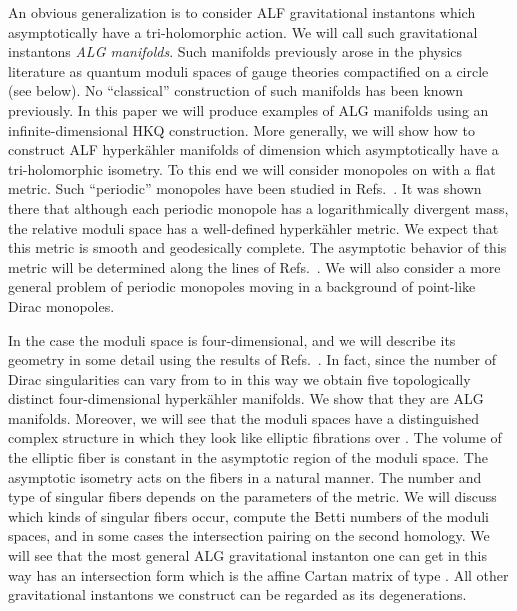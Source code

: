 \documentclass[a4paper,12pt, amsfonts, amssymb]{article}
\providecommand{\CC}{{\mathbb C}}
\providecommand{\RR}{{\mathbb R}}
\renewcommand{\SS}{{\mathbb S}}
\begin{document}
An obvious generalization is to consider ALF gravitational instantons
which asymptotically have a tri-holomorphic \coordHE{} action. We will call such
gravitational instantons {\it ALG manifolds}. Such manifolds previously
arose in the physics literature as quantum moduli spaces of \coordHE{}  \coordHE{} gauge
theories compactified on a circle (see below). No ``classical''
construction of such manifolds has been known previously. In this paper we
will produce examples of ALG manifolds using an infinite-dimensional HKQ
construction. More generally, we will show
how to construct ALF hyperk\"ahler manifolds of dimension \coordHE{} which
asymptotically have a tri-holomorphic \coordHE{} isometry.
To this end we will consider \coordHE{}  \coordHE{} monopoles on
\myHighlight{$\RR^2\times\SS^1$}\coordHE{} with a flat metric. Such ``periodic'' monopoles have
been studied in Refs.~\cite{usone, ustwo}.
It was shown there that although each
periodic monopole has a logarithmically divergent mass, the relative
moduli space has a well-defined hyperk\"ahler metric. We expect
that this metric is smooth and geodesically complete. The asymptotic
behavior of this metric will be determined along the lines of Refs.~\cite{Mtn,GM}.
We will also consider a more general problem of periodic \coordHE{} monopoles
moving in a background of point-like Dirac monopoles.

In the case \coordHE{} the moduli space is four-dimensional, and
we will describe its geometry in some detail using the results of Refs.~\cite{usone,ustwo}. In fact, since the number of Dirac singularities
\coordHE{} can vary from \coordHE{} to \coordHE{} in this way we obtain five topologically
distinct four-dimensional hyperk\"ahler manifolds. We show that they are
ALG manifolds. Moreover, we will see that
the moduli spaces have a distinguished complex structure in which they
look like elliptic fibrations over \myHighlight{$\CC$}\coordHE{}. The volume of the elliptic
fiber is constant in the asymptotic region of the moduli space.
The asymptotic \coordHE{} isometry
acts on the fibers in a natural manner. The number and type of singular
fibers depends on the parameters of the metric.
We will discuss which kinds of singular fibers occur,
compute the Betti numbers of the moduli spaces, and in some cases the intersection pairing on the second homology.
We will see that the most general ALG gravitational instanton one can get in this way has an intersection form which is the affine Cartan matrix of type \coordHE{}. All other gravitational instantons we construct can be regarded as its degenerations.
\end{document}
